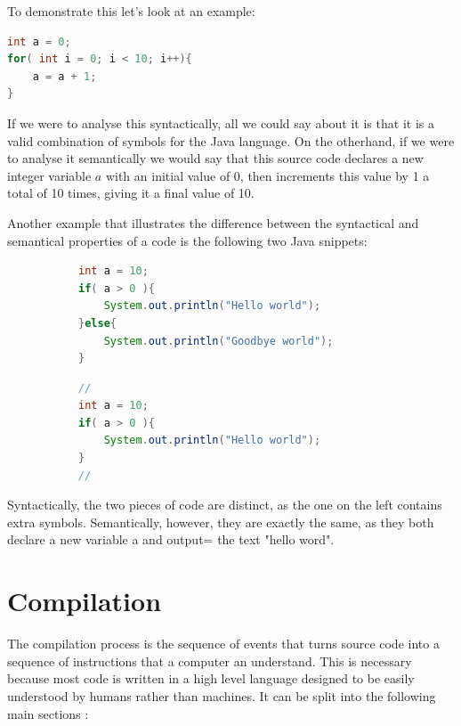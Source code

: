 \documentclass[ %
                    author={Jonathan Rankin},
                supervisor={Dr. David May, Dr. Ian Holyer},
                    degree={MEng},
                     title={CodeTouch},
                  subtitle={A Revolutionary Way To Program Real Code On Touch Screen Devices},
                      type={enterprise},
                      year={2015 } ]{dissertation}
\begin{document}
To demonstrate this let's look at an example: 

\begin{lstlisting}[language=Java]
int a = 0;
for( int i = 0; i < 10; i++){
    a = a + 1;
}
\end{lstlisting}

If we were to analyse this syntactically, all we could say about it is that it is a valid combination of symbols for the Java language. On the otherhand, if we were to analyse it semantically we would say that this source code declares a new integer variable $a$ with an initial value of 0, then increments this value by 1 a total of 10 times, giving it a final value of 10. 

Another example that illustrates the difference between the syntactical and semantical properties of a code is the following two Java snippets:

\begin{figure}[h]
\centering
\begin{subfigure}{0.5\textwidth}
  \centering

\begin{lstlisting}[language=Java]
int a = 10;
if( a > 0 ){
    System.out.println("Hello world");
}else{
    System.out.println("Goodbye world");
}
\end{lstlisting}


\end{subfigure}%
\begin{subfigure}{0.5\textwidth}
  \centering
\begin{lstlisting}[language=Java]
//
int a = 10;
if( a > 0 ){
    System.out.println("Hello world");
}
//
\end{lstlisting}


\end{subfigure}
\label{fig:success}
\end{figure}

Syntactically, the two pieces of code are distinct, as the one on the left contains extra symbols. Semantically, however, they are exactly the same, as they both declare a new variable a and output= the text "hello word".




\section{Compilation}
The compilation process is the sequence of events that turns source code into a sequence of instructions that a computer an understand. This is necessary because most code is written in a high level language designed to be easily understood by humans rather than machines. It can be split into the following main sections \cite{compiler}:
\end{document}
